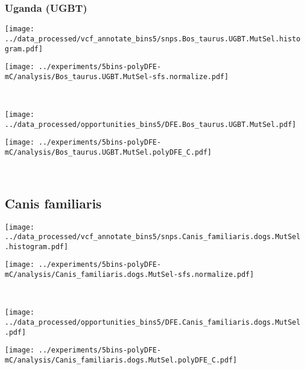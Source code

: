 \subsubsection{Uganda (UGBT)}

\begin{minipage}{0.49\linewidth}
    \texttt{[image: ../data\_processed/vcf\_annotate\_bins5/snps.Bos\_taurus.UGBT.MutSel.histogram.pdf]}
\end{minipage}
\begin{minipage}{0.49\linewidth}
    \texttt{[image: ../experiments/5bins-polyDFE-mC/analysis/Bos\_taurus.UGBT.MutSel-sfs.normalize.pdf]}
\end{minipage}
\\
\begin{minipage}{0.49\linewidth}
    \texttt{[image: ../data\_processed/opportunities\_bins5/DFE.Bos\_taurus.UGBT.MutSel.pdf]}
\end{minipage}
\begin{minipage}{0.49\linewidth}
    \texttt{[image: ../experiments/5bins-polyDFE-mC/analysis/Bos\_taurus.UGBT.MutSel.polyDFE\_C.pdf]}
\end{minipage}
\\

\subsection{Canis familiaris}

\begin{minipage}{0.49\linewidth}
    \texttt{[image: ../data\_processed/vcf\_annotate\_bins5/snps.Canis\_familiaris.dogs.MutSel.histogram.pdf]}
\end{minipage}
\begin{minipage}{0.49\linewidth}
    \texttt{[image: ../experiments/5bins-polyDFE-mC/analysis/Canis\_familiaris.dogs.MutSel-sfs.normalize.pdf]}
\end{minipage}
\\
\begin{minipage}{0.49\linewidth}
    \texttt{[image: ../data\_processed/opportunities\_bins5/DFE.Canis\_familiaris.dogs.MutSel.pdf]}
\end{minipage}
\begin{minipage}{0.49\linewidth}
    \texttt{[image: ../experiments/5bins-polyDFE-mC/analysis/Canis\_familiaris.dogs.MutSel.polyDFE\_C.pdf]}
\end{minipage}
\\

